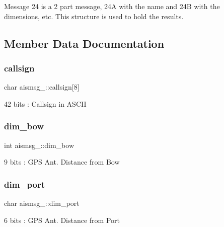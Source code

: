 Message 24 is a 2 part message, 24A with the name and 24B with the dimensions, etc. This structure is used to hold the results. 

\subsection{Member Data Documentation}
\mbox{\label{structaismsg__24_a4f228566aa426dcbae33dc20b5ceb966}} 
\subsubsection{\texorpdfstring{callsign}{callsign}}
{\footnotesize\ttfamily char aismsg\+\_\+::callsign\mbox{[}8\mbox{]}}



42 bits \+: Callsign in A\+S\+C\+II 

\mbox{\label{structaismsg__24_ac5d275e5489beeab8d031950269bc5fe}} 
\subsubsection{\texorpdfstring{dim\+\_\+bow}{dim\_bow}}
{\footnotesize\ttfamily int aismsg\+\_\+::dim\+\_\+bow}



9 bits \+: G\+PS Ant. Distance from Bow 

\mbox{\label{structaismsg__24_aa97c1413316032a1a67219a09b00b774}} 
\subsubsection{\texorpdfstring{dim\+\_\+port}{dim\_port}}
{\footnotesize\ttfamily char aismsg\+\_\+::dim\+\_\+port}



6 bits \+: G\+PS Ant. Distance from Port 

\mbox{\label{structaismsg__24_a4e020d67718ed77036c5761f93a69c45}} 
